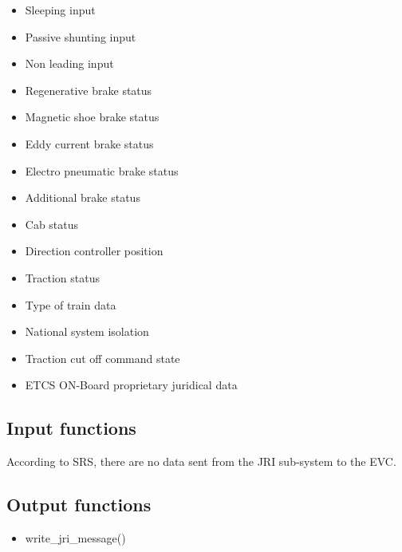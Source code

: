 \documentclass{template/openetcs_article}
\begin{document}
\begin{itemize}
			\item Sleeping input
			\item Passive shunting input
			\item Non leading input
			\item Regenerative brake status
			\item Magnetic shoe brake status
			\item Eddy current brake status
			\item Electro pneumatic brake status
			\item Additional brake status
			\item Cab status
			\item Direction controller position
			\item Traction status
			\item Type of train data
			\item National system isolation
			\item Traction cut off command state
			\item ETCS ON-Board proprietary juridical data
		\end{itemize}
		
	\subsection{Input functions}
		According to SRS, there are no data sent from the JRI sub-system to the EVC.
	\subsection{Output functions}
		\begin{itemize}
			\item write\_jri\_message()
		\end{itemize}

\end{document}
